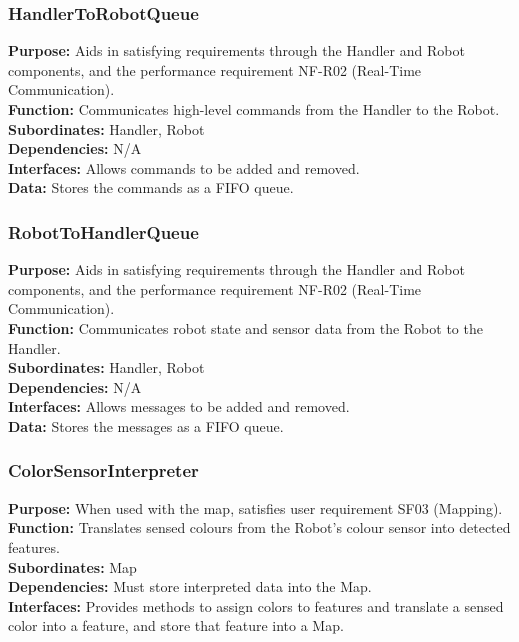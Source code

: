 \documentclass[12pt,a4paper]{article}
\begin{document}
\subsubsection{HandlerToRobotQueue}
	\textbf{Purpose:} Aids in satisfying requirements through the Handler and Robot components, and the performance requirement NF-R02 (Real-Time Communication).\\
	\textbf{Function:} Communicates high-level commands from the Handler to the Robot.\\
	\textbf{Subordinates:} Handler, Robot\\
	\textbf{Dependencies:} N/A\\
	\textbf{Interfaces:} Allows commands to be added and removed.\\
    \textbf{Data:} Stores the commands as a FIFO queue.\\
    
\subsubsection{RobotToHandlerQueue}
	\textbf{Purpose:} Aids in satisfying requirements through the Handler and Robot components, and the performance requirement NF-R02 (Real-Time Communication).\\
	\textbf{Function:} Communicates robot state and sensor data from the Robot to the Handler.\\
	\textbf{Subordinates:} Handler, Robot\\
	\textbf{Dependencies:} N/A\\
	\textbf{Interfaces:} Allows messages to be added and removed.\\
    \textbf{Data:} Stores the messages as a FIFO queue.\\
    
\subsubsection{ColorSensorInterpreter}
	\textbf{Purpose:} When used with the map, satisfies user requirement SF03 (Mapping).\\
	\textbf{Function:} Translates sensed colours from the Robot's colour sensor into detected features.\\
	\textbf{Subordinates:} Map\\
	\textbf{Dependencies:} Must store interpreted data into the Map.\\
	\textbf{Interfaces:} Provides methods to assign colors to features and translate a sensed color into a feature, and store that feature into a Map.\\
\end{document}
